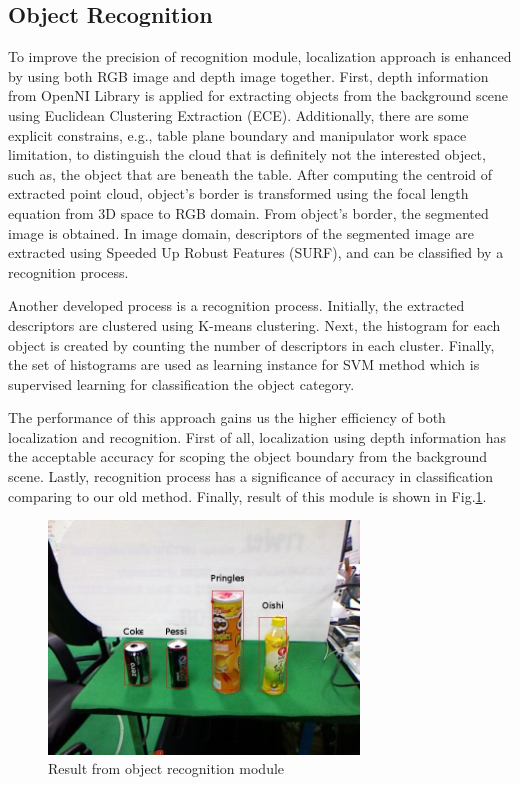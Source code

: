 \documentclass{llncs}
\begin{document}
\subsection{Object Recognition}
    
To improve the precision of recognition module, localization approach is enhanced by using both RGB image and depth image together. First, depth information from OpenNI Library is applied for extracting objects from the background scene using Euclidean Clustering Extraction (ECE)\cite{ece}\cite{rudu.thesis}. Additionally, there are some explicit constrains, e.g., table plane boundary and manipulator work space limitation, to distinguish the cloud that is definitely not the interested object, such as, the object that are beneath the table. After computing the centroid of extracted point cloud, object's border is transformed using the focal length equation from 3D space to RGB domain. From object's border, the segmented image is obtained. In image domain, descriptors of the segmented image are extracted using Speeded Up Robust Features (SURF), and can be classified by a recognition process.

Another developed process is a recognition process. Initially, the extracted descriptors are clustered using K-means clustering. Next, the histogram for each object is created by counting the number of descriptors in each cluster. Finally, the set of histograms are used as learning instance for SVM method which is supervised learning for classification the object category\cite{obj_rec}.

The performance of this approach gains us the higher efficiency of both localization and recognition. First of all, localization using depth information has the acceptable accuracy for scoping the object boundary from the background scene. Lastly, recognition process has a significance of accuracy in classification comparing to our old method. Finally, result of this module is shown in Fig.\ref{fig:object_recog}.

\begin{figure}
\centering
\includegraphics[height=6.2cm]{object_recognition_figure}
\caption{Result from object recognition module}
\label{fig:object_recog}
\end{figure}
\end{document}
